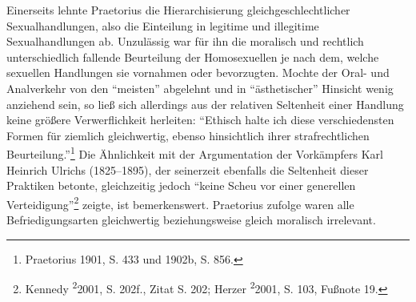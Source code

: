 \documentclass[a4paper,
fontsize=11pt,
oneside,
numbers=noperiodatend,
parskip=half-,
bibliography=totoc,
final
]{scrartcl}
\begin{document}
Einerseits lehnte Praetorius die Hierarchisierung gleichgeschlechtlicher
Sexualhandlungen, also die Einteilung in legitime und illegitime
Sexualhandlungen ab. Unzulässig war für ihn die moralisch und rechtlich
unterschiedlich fallende Beurteilung der Homosexuellen je nach dem,
welche sexuellen Handlungen sie vornahmen oder bevorzugten. Mochte der
Oral- und Analverkehr von den \enquote{meisten} abgelehnt und in
\enquote{ästhetischer} Hinsicht wenig anziehend sein, so ließ sich
allerdings aus der relativen Seltenheit einer Handlung keine größere
Verwerflichkeit herleiten: \enquote{Ethisch halte ich diese
verschiedensten Formen für ziemlich gleichwertig, ebenso hinsichtlich
ihrer strafrechtlichen Beurteilung.}\footnote{Praetorius 1901, S. 433
  und 1902b, S. 856.} Die Ähnlichkeit mit der Argumentation der
Vorkämpfers Karl Heinrich Ulrichs (1825--1895), der seinerzeit ebenfalls
die Seltenheit dieser Praktiken betonte, gleichzeitig jedoch
\enquote{keine Scheu vor einer generellen Verteidigung}\footnote{Kennedy
  \textsuperscript{2}2001, S. 202f., Zitat S. 202; Herzer
  \textsuperscript{2}2001, S. 103, Fußnote 19.} zeigte, ist
bemerkenswert. Praetorius zufolge waren alle Befriedigungsarten
gleichwertig beziehungsweise gleich moralisch irrelevant.
\end{document}
